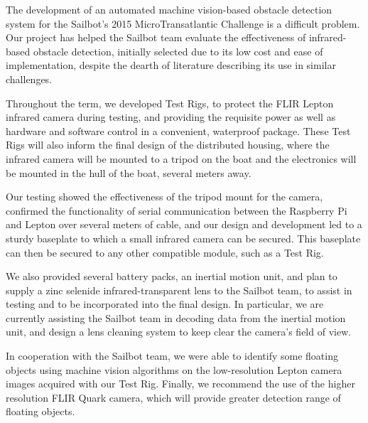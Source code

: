 The development of an automated machine vision-based obstacle detection system for the Sailbot's 2015 MicroTransatlantic Challenge is a difficult problem. Our project has helped the Sailbot team evaluate the effectiveness of infrared-based obstacle detection, initially selected due to its low cost and ease of implementation, despite the dearth of literature describing its use in similar challenges.

Throughout the term, we developed Test Rigs, to protect the FLIR Lepton infrared camera during testing, and providing the requisite power as well as hardware and software control in a convenient, waterproof package. These Test Rigs will also inform the final design of the distributed housing, where the infrared camera will be mounted to a tripod on the boat and the electronics will be mounted in the hull of the boat, several meters away.

Our testing showed the effectiveness of the tripod mount for the camera, confirmed the functionality of serial communication between the Raspberry Pi and Lepton over several meters of cable, and our design and development led to a sturdy baseplate to which a small infrared camera can be secured. This baseplate can then be secured to any other compatible module, such as a Test Rig.

We also provided several battery packs, an inertial motion unit, and plan to supply a zinc selenide infrared-transparent lens to the Sailbot team, to assist in testing and to be incorporated into the final design. In particular, we are currently assisting the Sailbot team in decoding data from the inertial motion unit, and design a lens cleaning system to keep clear the camera's field of view.

In cooperation with the Sailbot team, we were able to identify some floating objects using machine vision algorithms on the low-resolution Lepton camera images acquired with our Test Rig. Finally, we recommend the use of the higher resolution FLIR Quark camera, which will provide greater detection range of floating objects.

